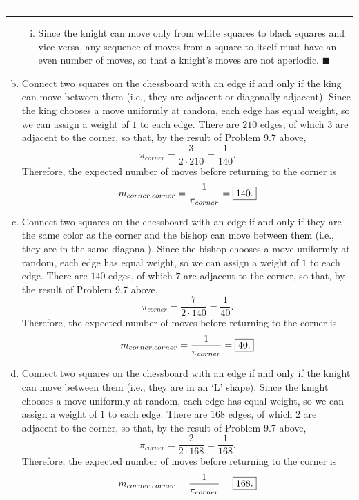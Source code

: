 \documentclass[11pt]{article}
\newcounter{questionCounter}
\newcounter{partCounter}[questionCounter]
\newenvironment{question}[2][\arabic{questionCounter}]{%
    \setcounter{partCounter}{0}%
    \vspace{.25in} \hrule \vspace{0.5em}%
        \noindent{\bf #2}%
    \vspace{0.8em} \hrule \vspace{.10in}%
    \addtocounter{questionCounter}{1}%
}{}
\renewcommand{\qed}{\quad $\blacksquare$}
\begin{document}
\begin{question}{Problem 9.8 Randomized Chess}
\begin{enumerate}[(a)]
\begin{enumerate}[(i)]
\item Since the knight can move only from white squares to black squares and
vice versa, any sequence of moves from a square to itself must have an even
number of moves, so that a knight's moves are not aperiodic. \qed
\end{enumerate}

\item Connect two squares on the chessboard with an edge if and only if the
king can move between them (i.e., they are adjacent or diagonally adjacent).
Since the king chooses a move uniformly at random, each edge has equal weight,
so we can assign a weight of $1$ to each edge. There are $210$ edges, of which
$3$ are adjacent to the corner, so that, by the result of Problem 9.7 above,
\[\pi_{corner} = \frac{3}{2 \cdot 210} = \frac{1}{140}.\] Therefore, the
expected number of moves before returning to the corner is
\[m_{corner,corner} = \frac{1}{\pi_{corner}} = \mbox{\fbox{$140$.}}\]

\item Connect two squares on the chessboard with an edge if and only if they
are the same color as the corner and the bishop can move between them (i.e.,
they are in the same diagonal). Since the bishop chooses a move uniformly at
random, each edge has equal weight, so we can assign a weight of $1$ to each
edge. There are $140$ edges, of which $7$ are adjacent to the corner, so that,
by the result of Problem 9.7 above,
\[\pi_{corner} = \frac{7}{2 \cdot 140} = \frac{1}{40}.\] Therefore, the
expected number of moves before returning to the corner is
\[m_{corner,corner} = \frac{1}{\pi_{corner}} = \mbox{\fbox{$40$.}}\]

\item Connect two squares on the chessboard with an edge if and only if the
knight can move between them (i.e., they are in an `L' shape). Since the
knight chooses a move uniformly at random, each edge has equal weight, so we
can assign a weight of $1$ to each edge. There are $168$ edges, of which $2$
are adjacent to the corner, so that, by the result of Problem 9.7 above,
\[\pi_{corner} = \frac{2}{2 \cdot 168} = \frac{1}{168}.\] Therefore, the
expected number of moves before returning to the corner is
\[m_{corner,corner} = \frac{1}{\pi_{corner}} = \mbox{\fbox{$168$.}}\]
\end{enumerate}
\end{question}
\end{document}
